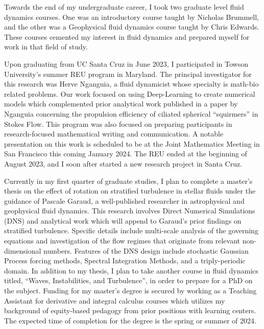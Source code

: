 \documentclass{article}
\begin{document}
Towards the end of my undergraduate career, I took two graduate level fluid dynamics courses. One was an introductory course taught by Nicholas Brummell, and the other was a Geophysical fluid dynamics course taught by Chris Edwards. These courses cemented my interest in fluid dynamics and prepared myself for work in that field of study. 

Upon graduating from UC Santa Cruz in June 2023, I participated in Towson University's summer REU program in Maryland. The principal investigator for this research was Herve Nganguia, a fluid dynamicist whose specialty is math-bio related problems. Our work focused on using Deep-Learning to create numerical models which complemented prior analytical work published in a paper by Nganguia concerning the propulsion efficiency of ciliated spherical ``squirmers'' in Stokes Flow. This program was also focused on preparing participants in research-focused mathematical writing and communication. A notable presentation on this work is scheduled to be at the Joint Mathematics Meeting in San Francisco this coming January 2024. The REU ended at the beginning of August 2023, and I soon after started a new research project in Santa Cruz. 

Currently in my first quarter of graduate studies, I plan to complete a master's thesis on the effect of rotation on stratified turbulence in stellar fluids under the guidance of Pascale Garaud, a well-published researcher in astrophysical and geophysical fluid dynamics. This research involves Direct Numerical Simulations (DNS) and analytical work which will append to Garaud's prior findings on stratified turbulence. Specific details include multi-scale analysis of the governing equations and investigation of the flow regimes that originate from relevant non-dimensional numbers. Features of the DNS design include stochastic Gaussian Process forcing methods, Spectral Integration Methods, and a triply-periodic domain. In addition to my thesis, I plan to take another course in fluid dynamics titled, ``Waves, Instabilities, and Turbulence'', in order to prepare for a PhD on the subject. Funding for my master's degree is secured by working as a Teaching Assistant for derivative and integral calculus courses which utilizes my background of equity-based pedagogy from prior positions with learning centers. The expected time of completion for the degree is the spring or summer of 2024. 
\end{document}
